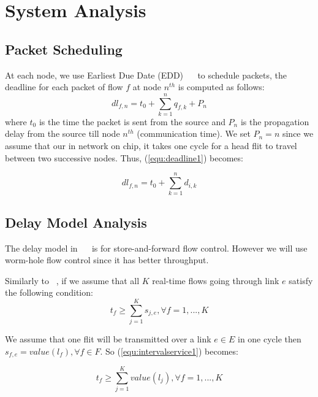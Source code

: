 \documentclass[conference, twocolumn]{IEEEtran}
\theoremstyle{definition}
\begin{document}
\section{System Analysis}
\subsection{Packet Scheduling}
At each node, we use Earliest Due Date (EDD)
~\cite{VermaJitter91}~\cite{LiuSchedulingRT} to schedule packets, the deadline
for each packet of flow $f$ at node $n^{th}$ is computed as follows:
\begin{equation}\label{equ:deadline1}
dl_{f,n}=t_0 + \sum_{k=1}^{n}q_{f,k}+P_n
\end{equation}
where $t_0$ is the time the packet is sent from the source and $P_n$ is the propagation
delay from the source till node $n^{th}$ (communication time). We set
$P_n=n$ since we assume that our in network on chip, it takes one cycle for a
head flit to travel between two successive nodes. Thus, (\ref{equ:deadline1}) becomes:

\begin{equation}\label{equ:deadline2}
dl_{f,n}=t_0 + \sum_{k=1}^{n}d_{i,k}
\end{equation}

\subsection{Delay Model Analysis}

The delay model in ~\cite{Ferrari90ascheme}~\cite{VermaJitter91} is
for store-and-forward flow control. However we will use worm-hole flow
control since it has better throughput.


Similarly to ~\cite{Ferrari90ascheme}, if we assume that all $K$ 
real-time flows going through link $e$ satisfy the following condition:
\begin{equation}\label{equ:intervalservice1}
t_f \geq \sum_{j=1}^Ks_{j,e}, \forall f = 1,...,K
\end{equation}

We assume that one flit will be transmitted over a link $e \in E$ in one cycle
then $s_{f,e}=value(l_f), \forall f \in F$. So (\ref{equ:intervalservice1})
becomes:

\begin{equation}\label{equ:intervalservice2}
t_f \geq \sum_{j=1}^Kvalue(l_j), \forall f = 1,...,K
\end{equation}
\end{document}
